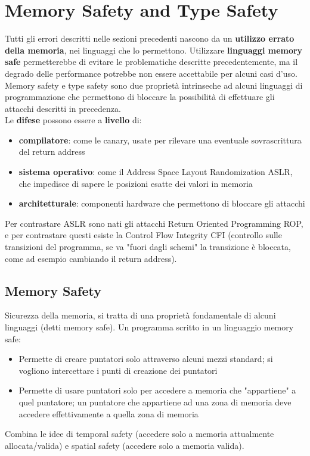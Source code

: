 
\section{Memory Safety and Type Safety}

Tutti gli errori descritti nelle sezioni precedenti nascono da un \textbf{utilizzo errato della memoria}, nei linguaggi che lo permettono. Utilizzare \textbf{linguaggi memory safe} permetterebbe di evitare le problematiche descritte precedentemente, ma il degrado delle performance potrebbe non essere accettabile per alcuni casi d'uso.\\
Memory safety e type safety sono due proprietà intrinseche ad alcuni linguaggi di programmazione che permettono di bloccare la possibilità di effettuare gli attacchi descritti in precedenza.\\

Le \textbf{difese} possono essere a \textbf{livello} di: 
\begin{itemize}
	\item \textbf{compilatore}: come le canary, usate per rilevare una eventuale sovrascrittura del return address
	\item \textbf{sistema operativo}: come il Address Space Layout Randomization ASLR, che impedisce di sapere le posizioni esatte dei valori in memoria
	\item \textbf{architetturale}: componenti hardware che permettono di bloccare gli attacchi
\end{itemize}

Per contrastare ASLR sono nati gli attacchi Return Oriented Programming ROP, e per contrastare questi esiste la Control Flow Integrity CFI (controllo sulle transizioni del programma, se va "fuori dagli schemi" la transizione è bloccata, come ad esempio cambiando il return address). \\

\subsection{Memory Safety }
Sicurezza della memoria, si tratta di una proprietà fondamentale di alcuni linguaggi (detti memory safe). Un programma scritto in un linguaggio memory safe:
\begin{itemize}
	\item Permette di creare puntatori solo attraverso alcuni mezzi standard; si vogliono intercettare i punti di creazione dei puntatori
	\item Permette di usare puntatori solo per accedere a memoria che "appartiene" a quel puntatore; un puntatore che appartiene ad una zona di memoria deve accedere effettivamente a quella zona di memoria 
\end{itemize}
Combina le idee di temporal safety (accedere solo a memoria attualmente allocata/valida) e spatial safety (accedere solo a memoria valida).\\

